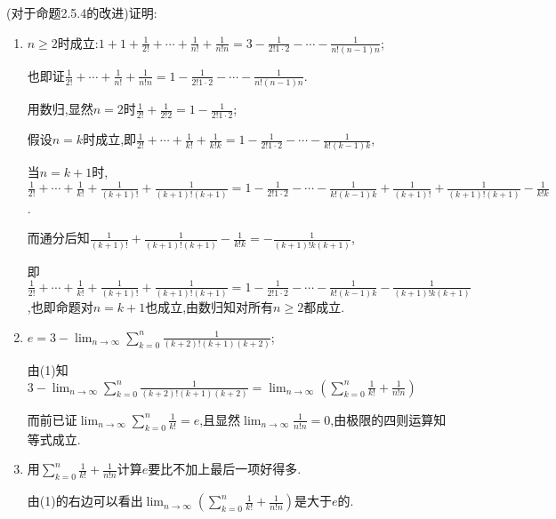      \begin{exercise}
         (对于命题2.5.4的改进)证明:
         \begin{enumerate}
             \item $n\geqslant2$时成立:$1+1+\frac{1}{2!}+\cdots+\frac{1}{n!}+\frac{1}{n!n}=3-\frac{1}{2!1\cdot2}-\cdots-\frac{1}{n!(n-1)n}$;
                   \begin{solution}
                       也即证$\frac{1}{2!}+\cdots+\frac{1}{n!}+\frac{1}{n!n}=1-\frac{1}{2!1\cdot2}-\cdots-\frac{1}{n!(n-1)n}$.

                       用数归,显然$n=2$时$\frac{1}{2!}+\frac{1}{2!2}=1-\frac{1}{2!1\cdot2}$;

                       假设$n=k$时成立,即$\frac{1}{2!}+\cdots+\frac{1}{k!}+\frac{1}{k!k}=1-\frac{1}{2!1\cdot2}-\cdots-\frac{1}{k!(k-1)k}$,

                       当$n=k+1$时,$\frac{1}{2!}+\cdots+\frac{1}{k!}+\frac{1}{(k+1)!}+\frac{1}{(k+1)!(k+1)}=1-\frac{1}{2!1\cdot2}-\cdots-\frac{1}{k!(k-1)k}+\frac{1}{(k+1)!}+\frac{1}{(k+1)!(k+1)}-\frac{1}{k!k}$.

                       而通分后知$\frac{1}{(k+1)!}+\frac{1}{(k+1)!(k+1)}-\frac{1}{k!k}=-\frac{1}{(k+1)!k(k+1)}$,

                       即$\frac{1}{2!}+\cdots+\frac{1}{k!}+\frac{1}{(k+1)!}+\frac{1}{(k+1)!(k+1)}=1-\frac{1}{2!1\cdot2}-\cdots-\frac{1}{k!(k-1)k}-\frac{1}{(k+1)!k(k+1)}$,也即命题对$n=k+1$也成立,由数归知对所有$n\geqslant2$都成立.
                   \end{solution}

             \item $e=3-\lim_{n\to\infty}\sum_{k=0}^n\frac{1}{(k+2)!(k+1)(k+2)}$;
                   \begin{solution}
                       由(1)知$3-\lim_{n\to\infty}\sum_{k=0}^n\frac{1}{(k+2)!(k+1)(k+2)}=\lim_{n\to\infty}\left(\sum_{k=0}^n\frac{1}{k!}+\frac{1}{n!n}\right)$

                       而前已证$\lim_{n\to\infty}\sum_{k=0}^n\frac{1}{k!}=e$,且显然$\lim_{n\to\infty}\frac{1}{n!n}=0$,由极限的四则运算知等式成立.
                   \end{solution}

             \item 用$\sum_{k=0}^n\frac{1}{k!}+\frac{1}{n!n}$计算$e$要比不加上最后一项好得多.
                   \begin{solution}
                       由(1)的右边可以看出$\lim_{n\to\infty}\left(\sum_{k=0}^n\frac{1}{k!}+\frac{1}{n!n}\right)$是大于$e$的.


\end{solution}
\end{enumerate}
\end{exercise}
